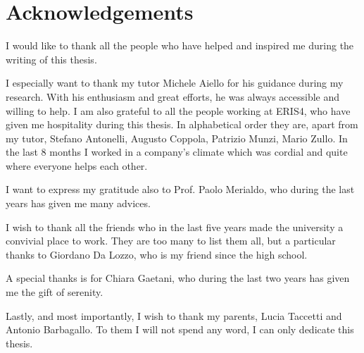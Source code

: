 \chapter{Acknowledgements}
I would like to thank all the people who have helped and inspired me during the writing of this thesis.

I especially want to thank my tutor Michele Aiello for his guidance during my research. With his enthusiasm and great efforts, he was always accessible and willing to help. I am also grateful to all the people working at ERIS4, who have given me hospitality during this thesis. In alphabetical order they are, apart from my tutor, Stefano Antonelli, Augusto Coppola, Patrizio Munzi, Mario Zullo. In the last 8 months I worked in a company's climate which was cordial and quite where everyone helps each other.

I want to express my gratitude also to Prof. Paolo Merialdo, who during the last years has given me many advices.

I wish to thank all the friends who in the last five years made the university a convivial place to work. They are too many to list them all, but a particular thanks to Giordano Da Lozzo, who is my friend since the high school.

A special thanks is for Chiara Gaetani, who during the last two years has given me the gift of serenity.

Lastly, and most importantly, I wish to thank my parents, Lucia Taccetti and Antonio Barbagallo. To them I will not spend any word, I can only dedicate this thesis.

